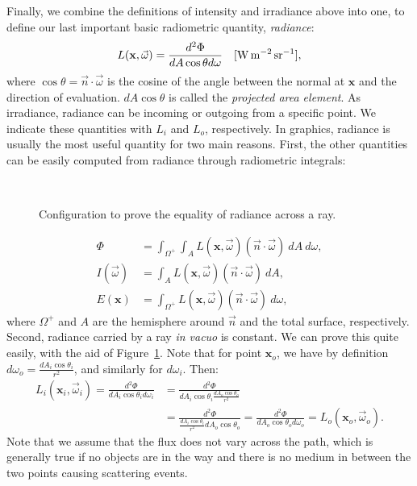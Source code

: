 Finally, we combine the definitions of intensity and irradiance above into one, to define our last important basic radiometric quantity, \emph{radiance}:
\begin{equation*}
L(\mathbf{x}, \vec{\omega}) = \frac{d^2 \Phi}{dA \cos\theta d \omega}  \siunit{\watt \per \square \metre \per \steradian},
\end{equation*}
where $\cos \theta = \vec{n} \cdot \vec{\omega}$ is the cosine of the angle between the normal at $\mathbf{x}$ and the direction of evaluation. $dA \cos\theta$ is called the \emph{projected area element}. As irradiance, radiance can be incoming or outgoing from a specific point. We indicate these quantities with $L_i$ and $L_o$, respectively. In graphics, radiance is usually the most useful quantity for two main reasons. First, the other quantities can be easily computed from radiance through radiometric integrals:
\begin{figure}
\centering
   \def\svgwidth{0.8\textwidth}
    \\
\caption{Configuration to prove the equality of radiance across a ray.} %
\label{fig:etendue}
\end{figure}
\begin{equation*}
\begin{split}
\Phi &= \int_{\Omega^+} \int_{A} L(\mathbf{x}, \vec{\omega})  (\vec{n} \cdot \vec{\omega}) \ dA \ d {\omega}, \\
I(\vec{\omega}) &= \int_{A} L(\mathbf{x}, \vec{\omega})  (\vec{n} \cdot \vec{\omega}) \ dA,  \\
E(\mathbf{x}) &= \int_{\Omega^+} L(\mathbf{x}, \vec{\omega})  (\vec{n} \cdot \vec{\omega}) \ d {\omega}, 
\end{split}
\end{equation*}
where $\Omega^+$ and $A$ are the hemisphere around $\vec{n}$ and the total surface, respectively. Second, radiance carried by a ray \emph{in vacuo} is constant. We can prove this quite easily, with the aid of Figure~\ref{fig:etendue}. Note that for point $\mathbf{x}_o$, we have by definition $d \omega_o = \frac{d A_i \cos\theta_i}{r^2}$, and similarly  for $d \omega_i$. Then:
\begin{equation*}
\begin{split}
L_i(\mathbf{x}_i, \vec{\omega}_i) = \frac{d^2 \Phi}{d A_i \cos\theta_i d \omega_i} &= 
\frac{d^2 \Phi}{d A_i \cos\theta_i \frac{d A_o \cos\theta_o}{r^2}}  
\\ &= \frac{d^2 \Phi}{\frac{d A_i \cos\theta_i}{r^2} d A_o \cos\theta_o } 
= \frac{d^2 \Phi}{d A_o \cos\theta_o d \omega_o} = L_o(\mathbf{x}_o, \vec{\omega}_o).
\end{split}
\end{equation*}
Note that we assume that the flux does not vary across the path, which is generally true if no objects are in the way and there is no medium in between the two points causing scattering events. 

